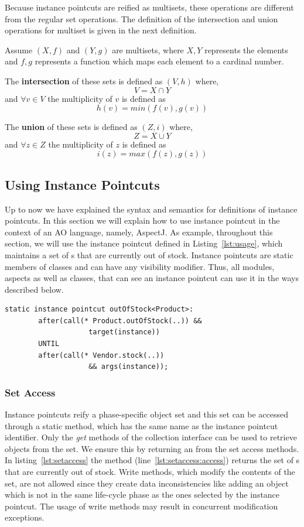 Because instance pointcuts are reified as multisets, these operations are different from the regular set operations. The definition of the intersection and union operations for multiset is given in the next definition.

\begin{mydef}
\label{def:inun}
Assume $(X, f)$ and $(Y, g)$ are multisets, where $X, Y$ represents the elements and $f, g$ represents a function which maps each element to a cardinal number.

The \textbf{intersection} of these sets is defined as $(V, h)$ where,
\[V = X \cap Y\] and
$\forall v \in V$ the multiplicity of $v$ is defined as \[h(v) =  min(f(v),g(v))\]

The \textbf{union} of these sets is defined as $(Z, i)$ where,
\[Z = X \cup Y\] and
$\forall z \in Z$ the multiplicity of $z$ is defined as \[i(z) =  max(f(z),g(z))\]
\end{mydef}

\subsection{Using Instance Pointcuts}
Up to now we have explained the syntax and semantics for definitions of instance pointcuts.
In this section we will explain how to use instance pointcut in the context of an AO language, namely, AspectJ.
As example, throughout this section, we will use the instance pointcut defined in Listing~\ref{lst:usage}, which maintains a set of s that are currently out of stock.
Instance pointcuts are static members of classes and can have any visibility modifier.
Thus, all modules, aspects as well as classes, that can see an instance pointcut can use it in the ways described below.

\begin{lstlisting}[float=h!, caption={An instance pointcut for out of stock products}, label={lst:usage}]
	static instance pointcut outOfStock<Product>:
		after(call(* Product.outOfStock(..)) &&
					target(instance))
		UNTIL
		after(call(* Vendor.stock(..))
					&& args(instance));
\end{lstlisting}

\subsubsection{Set Access}
Instance pointcuts reify a phase-specific object set and this set can be accessed through a static method, which has the same name as the instance pointcut identifier. Only the \emph{get} methods of the collection interface can be used to retrieve objects from the set. We ensure this by returning an  from the set access methods. In listing~\ref{lst:setaccess} the  method (line~\ref{lst:setaccess:access}) returns the set of s that are currently out of stock. Write methods, which modify the contents of the set, are not allowed since they create data inconsistencies like adding an object which is not in the same life-cycle phase as the ones selected by the instance pointcut. The usage of write methods may result in concurrent modification exceptions.


